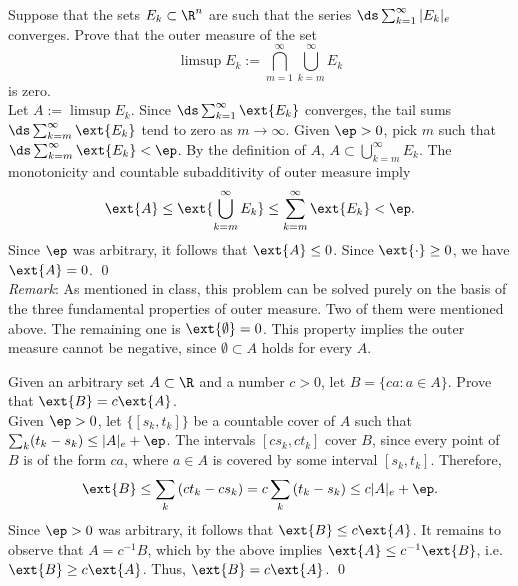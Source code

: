 \begin{hwsol}
Suppose that the sets $E_k \subset \R^n$ are such that the series $\ds\sum_{k=1}^\infty |E_k|_e$ converges. Prove that the outer measure of the set
	\[
	\limsup E_k:= \bigcap_{m=1}^\infty \bigcup_{k=m}^\infty E_k
	\]
is zero. \\

\pf Let $A:= \limsup E_k$. Since $\ds\sum_{k=1}^\infty \ext{E_k}$ converges, the tail sums $\ds\sum_{k=m}^\infty \ext{E_k}$ tend to zero as $m \to \infty$. Given $\ep>0$, pick $m$ such that $\ds\sum_{k=m}^\infty \ext{E_k} < \ep$. By the definition of $A$, $A \subset \bigcup_{k=m}^\infty E_k$. The monotonicity and countable subadditivity of outer measure imply 
	\[
	\ext{A} \leq \ext{\bigcup_{k=m}^\infty E_k} \leq \sum_{k=m}^\infty \ext{E_k} < \ep.
	\]
Since $\ep$ was arbitrary, it follows that $\ext{A} \leq 0$. Since $\ext{\cdot} \geq 0$, we have $\ext{A}=0$. \qed \\


\noindent \emph{Remark}: As mentioned in class, this problem can be solved purely on the basis of the three fundamental properties of outer measure. Two of them were mentioned above. The remaining one is $\ext{\emptyset}= 0$. This property implies the outer measure cannot be negative, since $\emptyset \subset A$ holds for every $A$. \\
\end{hwsol}


\begin{hwsol}
Given an arbitrary set $A \subset \R$ and a number $c>0$, let $B = \{ ca \colon a \in A \}$. Prove that $\ext{B}= c \ext{A}$. \\

\pf Given $\ep>0$, let $\{[s_k, t_k]\}$ be a countable cover of $A$ such that $\sum_k (t_k-s_k) \le  |A|_e + \ep$. The intervals $[cs_k, ct_k]$ cover $B$, since every point of $B$ is of the form $ca$, where $a \in A$ is covered by some interval $[s_k, t_k]$. Therefore, 
	\[
	\ext{B} \leq \sum_k \,(ct_k-cs_k) = c \sum_k \,(t_k-s_k) \leq  c|A|_e + \ep.
	\]
Since $\ep > 0$ was arbitrary, it follows that $\ext{B} \leq c \ext{A}$. It remains to observe that $A= c^{-1} B$, which by the above implies $\ext{A} \leq c^{-1} \ext{B}$, i.e. $\ext{B} \geq c \ext{A}$. Thus,  $\ext{B} = c \ext{A}$. \qed \\
\end{hwsol}


